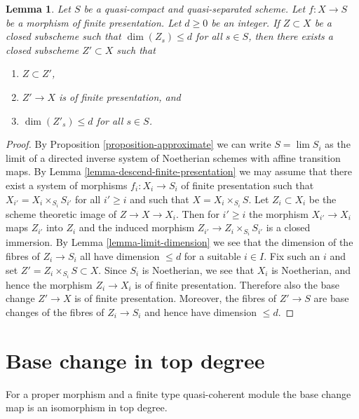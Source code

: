 \documentclass{stacks-project}
\theoremstyle{plain}
\newtheorem{lemma}[subsection]{Lemma}
\theoremstyle{definition}
\theoremstyle{remark}
\numberwithin{equation}{subsection}
\def\lim{\mathop{\mathrm{lim}}\nolimits}
\begin{document}
\begin{lemma}
\label{lemma-approximate-given-relative-dimension}
Let $S$ be a quasi-compact and quasi-separated scheme.
Let $f : X \to S$ be a morphism of finite presentation.
Let $d \geq 0$ be an integer.
If $Z \subset X$ be a closed subscheme such that
$\dim(Z_s) \leq d$ for all $s \in S$, then there exists a
closed subscheme $Z' \subset X$ such that
\begin{enumerate}
\item $Z \subset Z'$,
\item $Z' \to X$ is of finite presentation, and
\item $\dim(Z'_s) \leq d$ for all $s \in S$.
\end{enumerate}
\end{lemma}

\begin{proof}
By
Proposition \ref{proposition-approximate}
we can write $S = \lim S_i$ as the limit of a directed inverse
system of Noetherian schemes with affine transition maps. By
Lemma \ref{lemma-descend-finite-presentation}
we may assume that there exist a system of morphisms
$f_i : X_i \to S_i$ of finite presentation such that
$X_{i'} = X_i \times_{S_i} S_{i'}$
for all $i' \geq i$ and such that $X = X_i \times_{S_i} S$.
Let $Z_i \subset X_i$ be the scheme theoretic image of
$Z \to X \to X_i$. Then for $i' \geq i$ the morphism $X_{i'} \to X_i$
maps $Z_{i'}$ into $Z_i$ and the induced morphism
$Z_{i'} \to Z_i \times_{S_i} S_{i'}$ is a closed immersion. By
Lemma \ref{lemma-limit-dimension}
we see that the dimension of the fibres of $Z_i \to S_i$
all have dimension $\leq d$ for a suitable $i \in I$.
Fix such an $i$ and set $Z' = Z_i \times_{S_i} S \subset X$.
Since $S_i$ is Noetherian, we see that $X_i$ is Noetherian, and hence
the morphism $Z_i \to X_i$ is of finite presentation.
Therefore also the base change $Z' \to X$ is of finite presentation.
Moreover, the fibres of $Z' \to S$ are base changes of the fibres
of $Z_i \to S_i$ and hence have dimension $\leq d$.
\end{proof}






\section{Base change in top degree}
\label{section-top-degree}

\noindent
For a proper morphism and a finite type quasi-coherent module
the base change map is an isomorphism in top degree.
\end{document}
